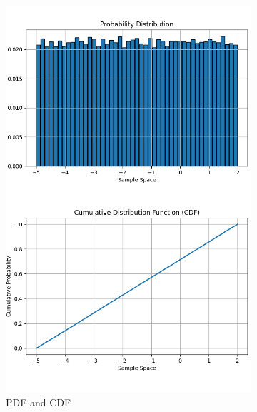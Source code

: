 \documentclass{article}
\begin{document}
\newpage

\begin{figure}[H]
  \centering
  \begin{subfigure}{0.45\textwidth}
    \centering
    \includegraphics[width=\linewidth]{results/section1/b1(1).png}
    \caption{PDF and CDF}
  \end{subfigure}
  \hfill
  \begin{subfigure}{0.45\textwidth}

\end{subfigure}
\end{figure}
\end{document}
